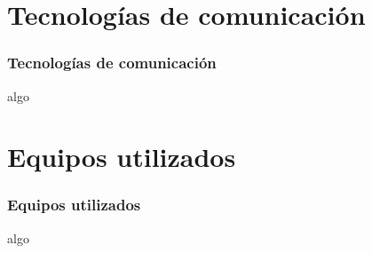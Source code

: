 \section{Tecnolog\'ias de comunicaci\'on}
  \begin{frame}
    \frametitle{Tecnolog\'ias de comunicaci\'on}
    algo
  \end{frame}
\section{Equipos utilizados}
  \begin{frame}
    \frametitle{Equipos utilizados}
    algo
  \end{frame}
